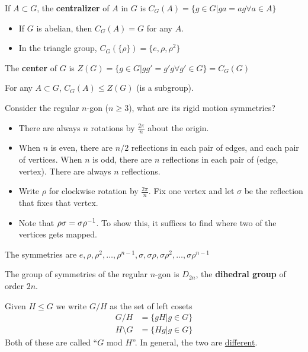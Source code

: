 \documentclass[a4paper]{article}
\begin{document}
\begin{definition}[Centralizer]
    If $A\subset G$, the \textbf{centralizer} of $A$ in $G$ is $C_G(A)=\{g\in G|ga= ag\forall a\in A\}$
\end{definition}
\begin{itemize}
    \item If $G$ is abelian, then $C_G(A)=G$ for any $A$. 
    \item In the triangle group, $C_G(\{\rho\})=\{e,\rho,\rho^2\}$
\end{itemize}
\begin{definition}[Center]
    The \textbf{center} of $G$ is $Z(G)=\{g\in G|gg'=g'g\forall g'\in G\}=C_G(G)$ 
\end{definition}
\begin{proposition}
    For any $A\subset G$, $C_G(A)\leq Z(G)$ (is a subgroup).
\end{proposition}

Consider the regular $n$-gon ($n\geq3$), what are its rigid motion symmetries?
\begin{itemize}
    \item There are always $n$ rotations by $\frac{2\pi}{n}$ about the origin.
    \item When $n$ is even, there are $n/2$ reflections in each pair of edges, and each pair of vertices. When $n$ is odd, there are $n$ reflections in each pair of (edge, vertex). There are always $n$ reflections.
    \item Write $\rho$ for clockwise rotation by $\frac{2\pi}{n}$. Fix one vertex and let $\sigma$ be the reflection that fixes that vertex.
    \item Note that $\rho\sigma=\sigma\rho^{-1}$. To show this, it suffices to find where two of the vertices gets mapped.
\end{itemize}
\begin{proposition}
    The symmetries are $e,\rho,\rho^2,\dots,\rho^{n-1},\sigma,\sigma\rho,\sigma\rho^2,\dots,\sigma\rho^{n-1}$
\end{proposition}
\begin{definition}
    The group of symmetries of the regular $n$-gon is $D_{2n}$, the \textbf{dihedral group} of order $2n$.
\end{definition}

Given $H\leq G$ we write $G/H$ as the set of left cosets
\begin{align}
    G/H&=\{gH|g\in G\}\\
    H\setminus G&=\{Hg|g\in G\}
\end{align}
Both of these are called ``$G$ mod $H$''. In general, the two are \underline{different}. 
\end{document}
